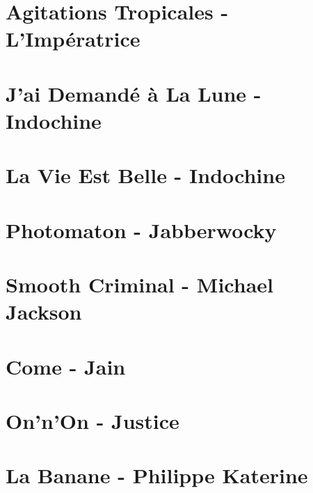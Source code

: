 \documentclass[11pt]{article}
\begin{document}
\section{Agitations Tropicales - L'Impératrice}




\section{J'ai Demandé à La Lune - Indochine}



\section{La Vie Est Belle - Indochine}
\begin{guitar}

\end{guitar}

\section{Photomaton - Jabberwocky}
\begin{guitar}

\end{guitar}



\section{Smooth Criminal - Michael Jackson}
\begin{guitar}

\end{guitar}

\section{Come - Jain}
\begin{guitar}

\end{guitar}

\section{On'n'On - Justice}


\section{La Banane - Philippe Katerine}

\end{document}
